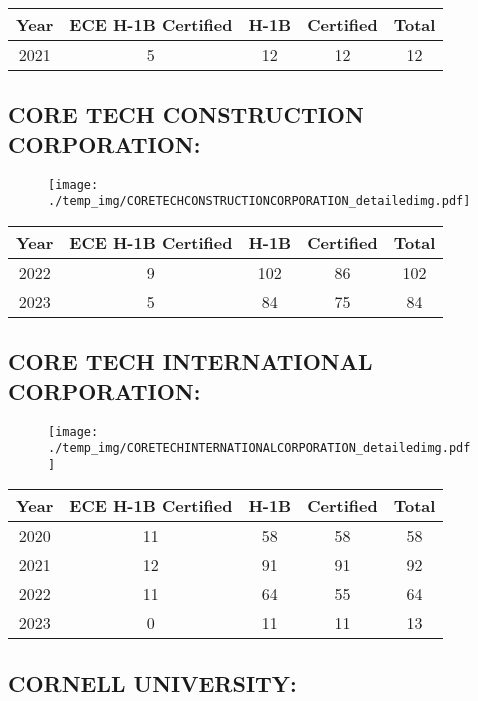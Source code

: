 \documentclass{article}%
\begin{document}
%
\begin{longtable}{c|c|c|c|c}%
\hline%
Year&ECE H{-}1B Certified&H{-}1B&Certified&Total\\%
\hline%
2021&5&12&12&12\\%
\hline%
\end{longtable}

%
\newpage%
\subsection{CORE TECH CONSTRUCTION CORPORATION:}%
\label{subsec:CORETECHCONSTRUCTIONCORPORATION}%
\label{CORETECHCONSTRUCTIONCORPORATIONdetailed}%


\begin{figure}[htbp]%
\centering%
\texttt{[image: ./temp\_img/CORETECHCONSTRUCTIONCORPORATION\_detailedimg.pdf]}%
\end{figure}

%
\begin{longtable}{c|c|c|c|c}%
\hline%
Year&ECE H{-}1B Certified&H{-}1B&Certified&Total\\%
\hline%
2022&9&102&86&102\\%
\hline%
2023&5&84&75&84\\%
\hline%
\end{longtable}

%
\newpage%
\subsection{CORE TECH INTERNATIONAL CORPORATION:}%
\label{subsec:CORETECHINTERNATIONALCORPORATION}%
\label{CORETECHINTERNATIONALCORPORATIONdetailed}%


\begin{figure}[htbp]%
\centering%
\texttt{[image: ./temp\_img/CORETECHINTERNATIONALCORPORATION\_detailedimg.pdf]}%
\end{figure}

%
\begin{longtable}{c|c|c|c|c}%
\hline%
Year&ECE H{-}1B Certified&H{-}1B&Certified&Total\\%
\hline%
2020&11&58&58&58\\%
\hline%
2021&12&91&91&92\\%
\hline%
2022&11&64&55&64\\%
\hline%
2023&0&11&11&13\\%
\hline%
\end{longtable}

%
\newpage%
\subsection{CORNELL UNIVERSITY:}%
\label{subsec:CORNELLUNIVERSITY}%
\label{CORNELLUNIVERSITYdetailed}%
\end{document}
